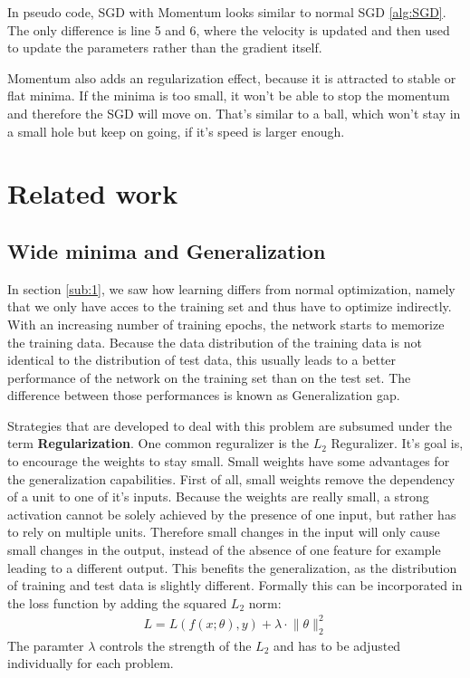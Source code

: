 In pseudo code, SGD with Momentum looks similar to normal SGD \ref{alg:SGD}. The
only difference is line 5 and 6, where the velocity is updated and then used to
update the parameters rather than the gradient itself.


Momentum also adds an regularization effect, because it is attracted to stable
or flat minima. If the minima is too small, it won't be able to stop the
momentum and therefore the SGD will move on. That's similar to a ball, which
won't stay in a small hole but keep on going, if it's speed is larger enough.






\section{Related work}
\subsection{Wide minima and Generalization}\label{sub:Generalization}
In section \ref{sub:1}, we saw how learning differs from normal optimization,
namely that we only have acces to the training set and thus have to optimize
indirectly. With an increasing number of training epochs, the network starts to
memorize the training data. Because the data distribution of the training data
is not identical to the distribution of test data, this usually leads to a
better performance of the network on the training set than on the test set. The
difference between those performances is known as Generalization gap. 

Strategies that are developed to deal with this problem are subsumed under the
term \textbf{Regularization}. One common reguralizer is the $L_2$ Reguralizer.
It's goal is, to encourage the weights to stay small. Small weights have some
advantages for the generalization capabilities. First of all, small weights
remove the dependency of a unit to one of it's inputs. Because the weights are
really small, a strong activation cannot be solely achieved by the presence of
one input, but rather has to rely on multiple units. Therefore small changes in
the input will only cause small changes in the output, instead of the absence of
one feature for example leading to a different output. This benefits the
generalization, as the distribution of training and test data is slightly
different. Formally this can be incorporated in the loss function by adding the
squared $L_2$ norm:
\begin{align}
    L= L(f(x;\theta), y)+\lambda \cdot \lVert \theta \rVert_2^2
\end{align}
The paramter $\lambda$ controls the strength of the $L_2$ and has to be adjusted individually
for each problem.

